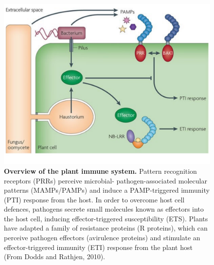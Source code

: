 \begin{figure}[h!]
    \centering
    \includegraphics[width=14cm]{Figures/DoddsArticleModel.pdf}
    \caption[Overview of the plant immune system.]{\textbf{Overview of the plant immune system.} Pattern recognition receptors (PRRs) perceive microbial- pathogen-associated molecular patterns (MAMPs/PAMPs) and induce a PAMP-triggered immunity (PTI) response from the host. In order to overcome host cell defences, pathogens secrete small molecules known as effectors into the host cell, inducing effector-triggered susceptibility (ETS). Plants have adapted a family of resistance proteins (R proteins), which can perceive pathogen effectors (avirulence proteins) and stimulate an effector-triggered immunity (ETI) response from the plant host (From Dodds and Rathjen, 2010).}
    \label{fig:PlantImmuneSystem}
\end{figure}

